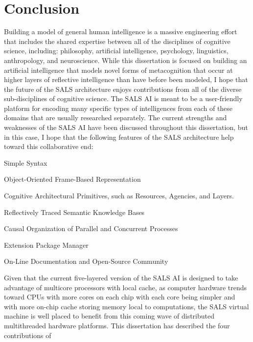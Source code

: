 \chapter{Conclusion}
\label{chapter:conclusion}

Building a model of general human intelligence is a massive
engineering effort that includes the shared expertise between all of
the disciplines of cognitive science, including: philosophy,
artificial intelligence, psychology, linguistics, anthropology, and
neuroscience.  While this dissertation is focused on building an
artificial intelligence that models novel forms of metacognition that
occur at higher layers of reflective intelligence than have before
been modeled, I hope that the future of the SALS architecture enjoys
contributions from all of the diverse sub-disciplines of cognitive
science.  The SALS AI is meant to be a user-friendly platform for
encoding many specific types of intelligences from each of these
domains that are usually researched separately.  The current strengths
and weaknesses of the SALS AI have been discussed throughout this
dissertation, but in this case, I hope that the following features of
the SALS architecture help toward this collaborative end:
\begin{packed_enumerate}
\item{Simple Syntax}
\item{Object-Oriented Frame-Based Representation}
\item{Cognitive Architectural Primitives, such as Resources, Agencies,
  and Layers.}
\item{Reflectively Traced Semantic Knowledge Bases}
\item{Causal Organization of Parallel and Concurrent Processes}
\item{Extension Package Manager}
\item{On-Line Documentation and Open-Source Community
  \cite[]{morgan:2012}}
\end{packed_enumerate}
Given that the current five-layered version of the SALS AI is designed
to take advantage of multicore processors with local cache, as
computer hardware trends toward CPUs with more cores on each chip with
each core being simpler and with more on-chip cache storing memory
local to computations, the SALS virtual machine is well placed to
benefit from this coming wave of distributed multithreaded hardware
platforms.  This dissertation has described the four contributions of
